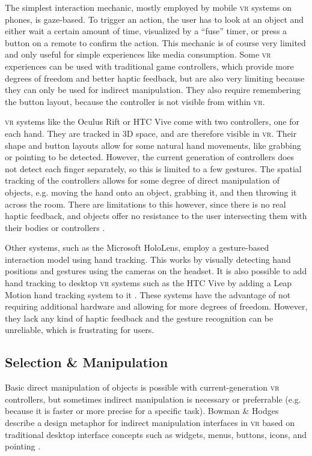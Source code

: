 \documentclass{tufte-book} %
\begin{document}
The simplest interaction mechanic, mostly employed by mobile \textsc{vr} systems on phones, is gaze-based. To trigger an action, the user has to look at an object and either wait a certain amount of time, visualized by a ``fuse'' timer, or press a button on a remote to confirm the action. This mechanic is of course very limited and only useful for simple experiences like media consumption. Some \textsc{vr} experiences can be used with traditional game controllers, which provide more degrees of freedom and better haptic feedback, but are also very limiting because they can only be used for indirect manipulation. They also require remembering the button layout, because the controller is not visible from within \textsc{vr}.

\textsc{vr} systems like the Oculus Rift or HTC Vive come with two controllers, one for each hand. They are tracked in 3D space, and are therefore visible in \textsc{vr}. Their shape and button layouts allow for some natural hand movements, like grabbing or pointing to be detected. However, the current generation of controllers does not detect each finger separately, so this is limited to a few gestures. The spatial tracking of the controllers allows for some degree of direct manipulation of objects, e.g. moving the hand onto an object, grabbing it, and then throwing it across the room. There are limitations to this however, since there is no real haptic feedback, and objects offer no resistance to the user intersecting them with their bodies or controllers \cite{sanchez2005presence}.

Other systems, such as the Microsoft HoloLens, employ a gesture-based interaction model using hand tracking. This works by visually detecting hand positions and gestures using the cameras on the headset. It is also possible to add hand tracking to desktop \textsc{vr} systems such as the HTC Vive by adding a Leap Motion hand tracking system to it \cite{wozniak2016possible}. These systems have the advantage of not requiring additional hardware and allowing for more degrees of freedom. However, they lack any kind of haptic feedback and the gesture recognition can be unreliable, which is frustrating for users.

\subsection{Selection \& Manipulation}
Basic direct manipulation of objects is possible with current-generation \textsc{vr} controllers, but sometimes indirect manipulation is necessary or preferrable (e.g. because it is faster or more precise for a specific task). Bowman \& Hodges describe a design metaphor for indirect manipulation interfaces in \textsc{vr}  based on traditional desktop interface concepts such as widgets, menus, buttons, icons, and pointing \cite{bowman1994wimp}.
\end{document}
